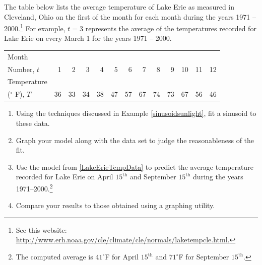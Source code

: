 \documentclass{ximera}
\begin{document}
\begin{problem}
The table below lists the average temperature of Lake Erie as measured in Cleveland, Ohio on the first of the month for each month during the years 1971 -- 2000.\footnote{See this website: \href{http://www.erh.noaa.gov/cle/climate/cle/normals/laketempcle.html}{\underline{http://www.erh.noaa.gov/cle/climate/cle/normals/laketempcle.html}.}}  For example,   $t=3$ represents the average of the temperatures recorded for Lake Erie on every March 1 for the years 1971 -- 2000.

\medskip

\small

\noindent \begin{tabular}{|l|r|r|r|r|r|r|r|r|r|r|r|r|} \hline
Month  & & & & & & & & & & & & \\
Number, $t$ & 1 & 2 & 3 & 4 & 5 & 6 & 7 & 8 & 9 & 10 & 11 & 12\\ 
\hline 
Temperature  & & & & & & & & & & & & \\
($^{\circ}$ F), $T$ & 36 & 33 & 34 & 38 & 47 & 57 & 67 & 74 & 73 & 67 & 56 & 46 \\ \hline
\end{tabular}

\normalsize


\begin{enumerate}

\item \label{LakeErieTempData} Using the techniques discussed in Example \ref{sinusoidsunlight}, fit a sinusoid to these data. 


\item  Graph your model along with the data set to judge the reasonableness of the fit.

\item Use the model from \ref{LakeErieTempData} to predict the average temperature recorded for Lake Erie on April $15^{\text{th}}$ and September $15^{\text{th}}$ during the years 1971--2000.\footnote{The computed average is $41^{\circ}$F for April $15^{\text{th}}$ and $71^{\circ}$F for September $15^{\text{th}}$.}

\item Compare your results to those obtained using a graphing utility.

\end{enumerate}
\end{problem}
\end{document}
